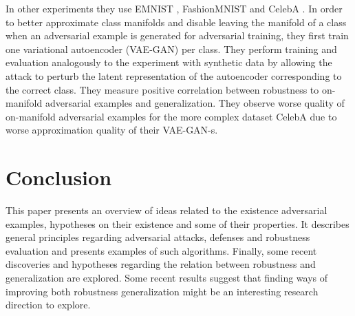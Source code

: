 \documentclass[conference,compsoc]{IEEEtran}
\begin{document}
In other experiments they use EMNIST \citep{Cohen:2017:EMNIST}, FashionMNIST \citep{Xiao:2017:FMNIDBMLA} and CelebA \citep{Liu:2015:DLFAW}. In order to better approximate class manifolds and disable leaving the manifold of a class when an adversarial example is generated for adversarial training, they first train one variational autoencoder (VAE-GAN) per class. They perform training and evaluation analogously to the experiment with synthetic data by allowing the attack to perturb the latent representation of the autoencoder corresponding to the correct class. They measure positive correlation between robustness to on-manifold adversarial examples and generalization. They observe worse quality of on-manifold adversarial examples for the more complex dataset CelebA due to worse approximation quality of their VAE-GAN-s.


\section{Conclusion}

This paper presents an overview of ideas related to the existence adversarial examples, hypotheses on their existence and some of their properties. It describes general principles regarding adversarial attacks, defenses and robustness evaluation and presents examples of such algorithms. Finally, some recent discoveries and hypotheses regarding the relation between robustness and generalization are explored. Some recent results \citep{Stutz:2018:DARG} suggest that finding ways of improving both robustness generalization might be an interesting research direction to explore.



% 
%

\end{document}
